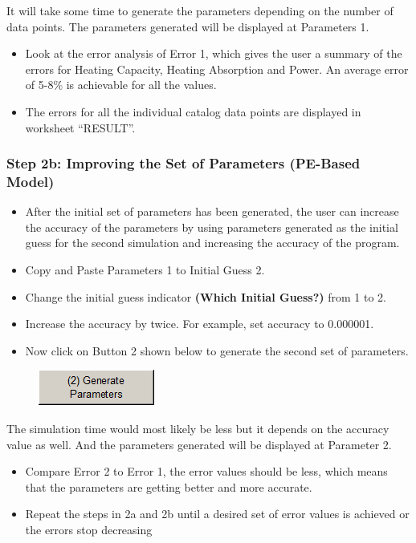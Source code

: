 It will take some time to generate the parameters depending on the number of data points. The parameters generated will be displayed at Parameters 1.

\begin{itemize}
\item
  Look at the error analysis of Error 1, which gives the user a summary of the errors for Heating Capacity, Heating Absorption and Power. An average error of 5-8\% is achievable for all the values.
\item
  The errors for all the individual catalog data points are displayed in worksheet ``RESULT''.
\end{itemize}

\subsubsection{Step 2b: Improving the Set of Parameters (PE-Based Model)}\label{step-2b-improving-the-set-of-parameters-pe-based-model}

\begin{itemize}
\item
  After the initial set of parameters has been generated, the user can increase the accuracy of the parameters by using parameters generated as the initial guess for the second simulation and increasing the accuracy of the program.
\item
  Copy and Paste Parameters 1 to Initial Guess 2.
\item
  Change the initial guess indicator \textbf{(Which Initial Guess?)} from 1 to 2.
\item
  Increase the accuracy by twice. For example, set accuracy to 0.000001.
\item
  Now click on Button 2 shown below to generate the second set of parameters.
\end{itemize}

\begin{figure}[htbp]
\centering
\includegraphics{media/image041.png}
\caption{}
\end{figure}

The simulation time would most likely be less but it depends on the accuracy value as well. And the parameters generated will be displayed at Parameter 2.

\begin{itemize}
\item
  Compare Error 2 to Error 1, the error values should be less, which means that the parameters are getting better and more accurate.
\item
  Repeat the steps in 2a and 2b until a desired set of error values is achieved or the errors stop decreasing
\end{itemize}

